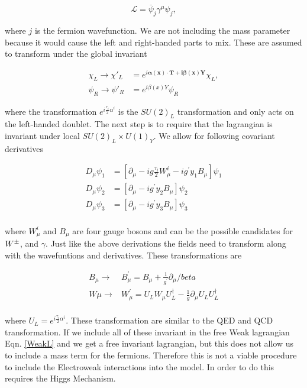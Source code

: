 \begin{equation}\label{WeakL}
\mathcal{L}=\overline{\psi}_j\gamma^\mu\psi_j,
\end{equation}

where $j$ is the fermion wavefunction. We are not including the mass parameter because it would cause the left and right-handed parts to mix.  These are assumed to transform under the global invariant

\begin{equation}\label{WeakGlobal}
\begin{split}
\chi_L\rightarrow\chi'_L&=e^{i\boldsymbol{\alpha(x)\cdot T+i\beta(x)Y}}\chi_L, \\
\psi_R\rightarrow\psi'_R&=e^{i\beta(x)Y}\psi_R
\end{split}
\end{equation}

where the transformation $e^{i\frac{\tau_i}{2}\alpha^i}$ is the $SU(2)_L$ transformation and only acts on the left-handed doublet. The next step is to require that the lagrangian is invariant under local $SU(2)_L\times U(1)_Y$. We allow for following covariant derivatives

\begin{equation}
\begin{split}
D_\mu\psi_1&=[\partial_\mu-ig\frac{\tau_i}{2}W_\mu^i-ig^\prime y_1 B_\mu]\psi_1 \\
D_\mu\psi_2&=[\partial_\mu-ig^\prime y_2 B_\mu]\psi_2 \\
D_\mu\psi_3&=[\partial_\mu-ig^\prime y_3 B_\mu]\psi_3 \\
\end{split}
\end{equation}

where $W_\mu^i$ and $B_\mu$ are four gauge bosons and can be the possible candidates for $W^\pm$, \Z and $\gamma$.  Just like the above derivations the fields need to transform along with the wavefuntions and derivatives. These transformations are 

\begin{equation}
\begin{split}
B_\mu\rightarrow&B^\prime_\mu=B_\mu+\frac{1}{g^\prime}\partial_\mu/beta \\
W\mu\rightarrow&W^\prime_\mu=U_L W_\mu U^\dagger_L-\frac{1}{g}\partial_\mu U_L U_L^\dagger \\
\end{split}
\end{equation}

where $U_L=e^{i\frac{\tau_i}{2}\alpha^i}$. These transformation are similar to the QED and QCD transformation. If we include all of these invariant in the free Weak lagrangian Eqn. \ref{WeakL} and we get a free invariant lagrangian, but this does not allow us to include a mass term for the fermions. Therefore this is not a viable procedure to include the Electroweak interactions into the model. In order to do this requires the Higgs Mechanism.

